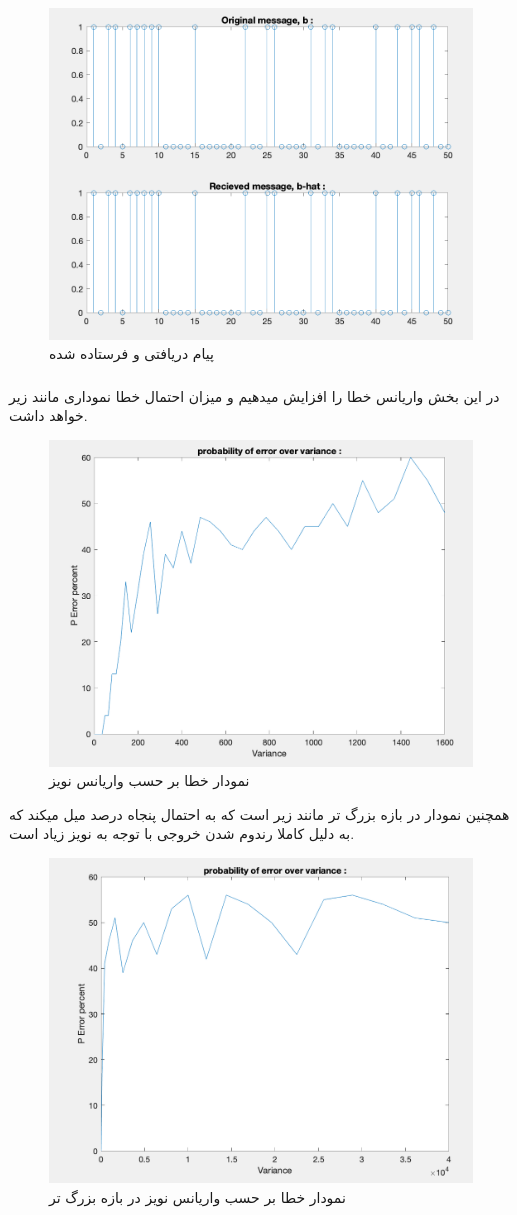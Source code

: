 \documentclass[10pt]{article}
\begin{document}
	\begin{figure}[h]
		\centering
		\includegraphics[width=0.7\linewidth]{../img/3.2.8}
		\caption{پیام دریافتی و فرستاده شده}
		\label{fig:3-2-8}
	\end{figure}
	
	
	
	\newpage
	\subsubsection{ }
	در این بخش واریانس خطا را افزایش میدهیم و میزان احتمال خطا نموداری مانند زیر خواهد داشت.
	\begin{figure}[H]
		\centering
		\includegraphics[width=0.6\linewidth]{../img/3.2.10}
		\caption{نمودار خطا بر حسب واریانس نویز}
		\label{fig:3-2-10}
	\end{figure}
	
	\newpage
	همچنین نمودار در بازه بزرگ تر مانند زیر است که به احتمال پنجاه درصد میل میکند که به دلیل کاملا رندوم شدن خروجی با توجه به نویز زیاد است.
	\begin{figure}[H]
		\centering
		\includegraphics[width=0.6\linewidth]{../img/3.2.9}
		\caption{نمودار خطا بر حسب واریانس نویز در بازه بزرگ تر}
		\label{fig:3-2-9}
	\end{figure}
	
\end{document}
